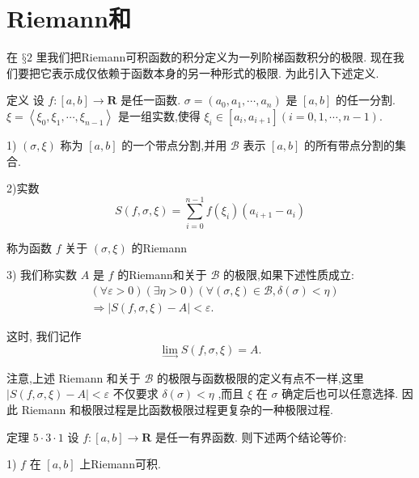\section{Riemann和}

在 $§2$ 里我们把Riemann可积函数的积分定义为一列阶梯函数积分的极限. 现在我们要把它表示成仅依赖于函数本身的另一种形式的极限. 为此引入下述定义.

定义 设 $f : \left\lbrack  {a,b}\right\rbrack   \rightarrow  \mathbf{R}$ 是任一函数. $\sigma  = \left( {{a}_{0},{a}_{1},\cdots ,{a}_{n}}\right)$ 是 $\left\lbrack  {a,b}\right\rbrack$ 的任一分割. $\xi  = \left\langle  {{\xi }_{0},{\xi }_{1},\cdots ,{\xi }_{n - 1}}\right\rangle$ 是一组实数,使得 ${\xi }_{i} \in  \left\lbrack  {{a}_{i},{a}_{i + 1}}\right\rbrack  \left( {i = 0,1,\cdots ,n - 1}\right) .$

1) $\left( {\sigma ,\xi }\right)$ 称为 $\left\lbrack  {a,b}\right\rbrack$ 的一个带点分割,并用 $\mathcal{B}$ 表示 $\left\lbrack  {a,b}\right\rbrack$ 的所有带点分割的集合.

2)实数
$$S\left( {f,\sigma ,\xi }\right)  = \mathop{\sum }\limits_{{i = 0}}^{{n - 1}}f\left( {\xi }_{i}\right) \left( {{a}_{i + 1} - {a}_{i}}\right)$$

称为函数 $f$ 关于 $\left( {\sigma ,\xi }\right)$ 的Riemann

3) 我们称实数 $A$ 是 $f$ 的Riemann和关于 $\mathcal{B}$ 的极限,如果下述性质成立:
\begin{align*}
	&\left( {\forall \varepsilon  > 0}\right) \left( {\exists \eta  > 0}\right) \left( {\forall \left( {\sigma ,\xi }\right)  \in  \mathcal{B},\delta \left( \sigma \right)  < \eta }\right)\\
	&\Rightarrow  \left| {S\left( {f,\sigma ,\xi }\right)  - A}\right|  < \varepsilon .
\end{align*}

这时, 我们记作
$$\mathop{\lim }\limits_{ \rightarrow  }S\left( {f,\sigma ,\xi }\right)  = A.$$

注意,上述 Riemann 和关于 $\mathcal{B}$ 的极限与函数极限的定义有点不一样,这里 $\left| {S\left( {f,\sigma ,\xi }\right)  - A}\right|  < \varepsilon$ 不仅要求 $\delta \left( \sigma \right)  < \eta$ ,而且 $\xi$ 在 $\sigma$ 确定后也可以任意选择. 因此 Riemann 和极限过程是比函数极限过程更复杂的一种极限过程.

定理 $5 \cdot  3 \cdot  1$ 设 $f : \left\lbrack  {a,b}\right\rbrack   \rightarrow  \mathbf{R}$ 是任一有界函数. 则下述两个结论等价:

1) $f$ 在 $\left\lbrack  {a,b}\right\rbrack$ 上Riemann可积.

